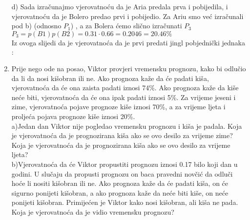 \documentclass[12pt]{article}
\begin{document}
\begin{enumerate}
\begin{center}
{d) Sada izračunajmo vjerovatnoću da je Aria predala prva i pobijedila, i vjerovatnoću da je Bolero predao prvi i pobijedio. Za Ariu smo već izračunali pod b) (odnosno $P_1$)
, a za Bolera ćemo slično izračunati $P_3$
\\ \vspace{0.25cm}
$P_3 = p(B1)p(B2) = 0.31 \cdot 0.66 = 0.2046 = 20.46\%$ \\
\vspace{0.25cm}
Iz ovoga slijedi da je vjerovatnoća da je prvi predati jingl pobjednički jednaka : \\ \vspace{0.25cm}
		}
		\end{center}
		
		
		
				\item Prije nego ode na posao, Viktor provjeri vremensku prognozu, kako bi odlučio da li da nosi kišobran ili ne. Ako prognoza kaže da će padati kiša, vjerovatnoća da će ona zaista padati iznosi 74\%. Ako prognoza kaže da kiše neće biti, vjerovatnoća da će ona ipak padati iznosi 5\%. Za vrijeme jeseni i zime, vjerovatnoća pojave prognoze kiše iznosi 70\%, a za vrijeme ljeta i proljeća pojava prognoze kiše iznosi 20\%. \\
				a)Jedan dan Viktor nije pogledao vremensku prognozu i kiša je padala. Koja je vjerovatnoća da je prognozirana kiša ako se ovo desilo za vrijeme zime? Koja je vjerovatnoća da je prognozirana kiša ako se ovo desilo za vrijeme ljeta?\\
				b)Vjerovatnoća da će Viktor propustiti prognozu iznosi 0.17 bilo koji dan u godini. U slučaju da propusti prognozu on baca pravedni novčić da odluči hoće li nositi kišobran ili ne. Ako prognoza kaže da će padati kiša, on će sigurno ponijeti kišobran, a ako prognoza kaže da neće biti kiše, on neće ponijeti kišobran. Primijećen je Viktor kako nosi kišobran, ali kiša ne pada. Koja je vjerovatnoća da je vidio vremensku prognozu?
				

\end{enumerate}
\end{document}
